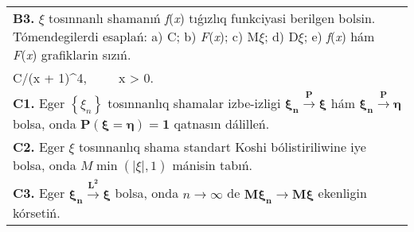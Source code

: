 \documentclass{article}
\begin{document}
\begin{tabular}{m{17cm}}
\textbf{B3.} $\xi$ tosınnanlı shamanıń \emph{f}(\emph{x}) tıǵızlıq funkciyasi berilgen bolsin. Tómendegilerdi esaplań: a) C; b) \emph{F}(\emph{x}); c) M$\xi$; d) D$\xi$; e) \emph{f}(\emph{x}) hám \emph{F}(\emph{x}) grafiklarin sızıń.\(f(x) = \left\{ \begin{matrix}
\ \ \ \ \ \ \ \ 0,\ \ \ \ \ \ \ \ \ \ \ \ x \leq 0, \\
C/(x + 1)^{4},\ \ \ \ \ x > 0.\ \ 
\end{matrix} \right.\ \)
 \\
\textbf{C1.} Eger \(\left\{ \xi_{n} \right\}\) tosınnanlıq shamalar izbe-izligi \(\mathbf{\xi}_{\mathbf{n}}\overset{\mathbf{P}}{\rightarrow}\mathbf{\xi}\) hám \(\mathbf{\xi}_{\mathbf{n}}\overset{\mathbf{P}}{\rightarrow}\mathbf{\eta}\) bolsa, onda \(\mathbf{P}\left( \mathbf{\xi = \eta} \right)\mathbf{=}\mathbf{1}\) qatnasın dálilleń.
 \\
\textbf{C2.} Eger \(\xi\) tosınnanlıq shama standart Koshi bólistiriliwine iye bolsa, onda \(M\min\left( |\xi|,1 \right)\) mánisin tabıń.
 \\
\textbf{C3.} Eger \(\mathbf{\xi}_{\mathbf{n}}\overset{\mathbf{L}^{\mathbf{2}}}{\rightarrow}\mathbf{\xi}\) bolsa, onda \(n \rightarrow \infty\) de \(\mathbf{M}\mathbf{\xi}_{\mathbf{n}}\mathbf{\rightarrow M\xi}\) ekenligin kórsetiń.
 \\

\end{tabular}
\vspace{1cm}
\end{document}
